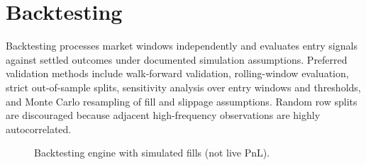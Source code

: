 \section{Backtesting}
\label{sec:backtesting}

Backtesting processes market windows independently and evaluates entry signals
against settled outcomes under documented simulation assumptions. Preferred
validation methods include walk-forward validation, rolling-window evaluation,
strict out-of-sample splits, sensitivity analysis over entry windows and
thresholds, and Monte Carlo resampling of fill and slippage assumptions. Random
row splits are discouraged because adjacent high-frequency observations are
highly autocorrelated.

\begin{figure}[t]
  \centering
  \caption{Backtesting engine with simulated fills (not live PnL).}
  \label{fig:backtest}
\end{figure}